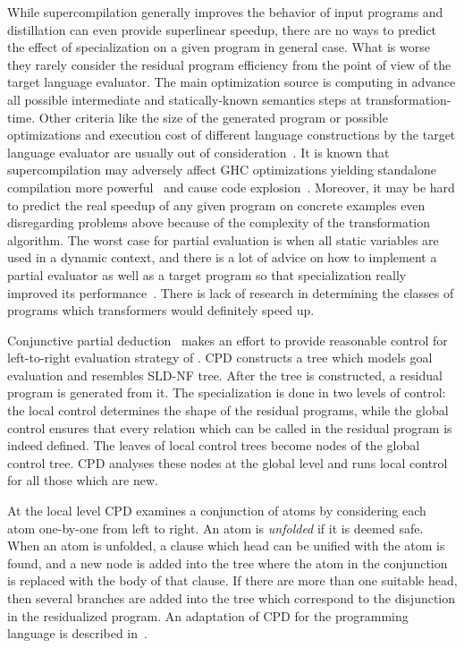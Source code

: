 While supercompilation generally improves the behavior of input programs and distillation can even provide superlinear speedup, there are no ways to predict the effect of specialization on a given program in general case.
What is worse they rarely consider the residual program efficiency from the point of view of the target language evaluator.
The main optimization source is computing in advance all possible intermediate and statically-known semantics steps at transformation-time.
Other criteria like the size of the generated program or possible optimizations and execution cost of different language constructions by the target language evaluator are usually out of consideration~\cite{jonesbook}.
It is known that supercompilation may adversely affect GHC optimizations yielding standalone compilation more powerful~\cite{SCBE,TCES} and cause code explosion~\cite{SCHC}.
Moreover, it may be hard to predict the real speedup of any given program on concrete examples even disregarding problems above because of the complexity of the transformation algorithm.
The worst case for partial evaluation is when all static variables are used in a dynamic context, and there is a lot of advice on how to implement a partial evaluator as well as a target program so that specialization really improved its performance~\cite{jonesbook,bulyonkov84}.
There is lack of research in determining the classes of programs which transformers would definitely speed up.

Conjunctive partial deduction~\cite{de1999conjunctive} makes an effort to provide reasonable control for left-to-right evaluation strategy of \pro{}.
CPD constructs a tree which models goal evaluation and resembles SLD-NF tree.
After the tree is constructed, a residual program is generated from it.
The specialization is done in two levels of control: the local control determines the shape of the residual programs, while the global control ensures that every relation which can be called in the residual program is indeed defined.
The leaves of local control trees become nodes of the global control tree.
CPD analyses these nodes at the global level and runs local control for all those which are new.

At the local level CPD examines a conjunction of atoms by considering each atom one-by-one from left to right.
An atom is \emph{unfolded} if it is deemed safe.
When an atom is unfolded, a clause which head can be unified with the atom is found, and a new node is added into the tree where the atom in the conjunction is replaced with the body of that clause.
If there are more than one suitable head, then several branches are added into the tree which correspond to the disjunction in the residualized program.
An adaptation of CPD for the \mk{} programming language is described in~\cite{lozov2019relational}.

